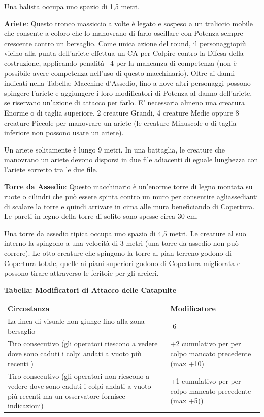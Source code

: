 \documentclass[a4paper,11pt,twoside,openany]{book}
\begin{document}
Una balista occupa uno spazio di 1,5 metri.

\textbf{Ariete}: Questo tronco massiccio a volte è legato e sospeso a un traliccio mobile che consente a coloro che lo manovrano di farlo oscillare con Potenza sempre crescente contro un bersaglio. Come unica azione del round, il personaggiopiù vicino alla punta dell'ariete effettua un CA per Colpire contro la Difesa della costruzione, applicando penalità --4 per la mancanza di competenza (non è possibile avere competenza nell'uso di questo macchinario). Oltre ai danni indicati nella Tabella: Macchine d'Assedio, fino a nove altri personaggi possono spingere l'ariete e aggiungere i loro modificatori di Potenza al danno dell'ariete, se riservano un'azione di attacco per farlo. E' necessaria almeno una creatura Enorme o di taglia superiore, 2 creature Grandi, 4 creature Medie oppure 8 creature Piccole per manovrare un ariete (le creature Minuscole o di taglia inferiore non possono usare un ariete).

Un ariete solitamente è lungo 9 metri. In una battaglia, le creature che manovrano un ariete devono disporsi in due file adiacenti di eguale lunghezza con l'ariete sorretto tra le due file.

\textbf{Torre da Assedio}: Questo macchinario è un'enorme torre di legno montata su ruote o cilindri che può essere spinta contro un muro per consentire agliassedianti di scalare la torre e quindi arrivare in cima alle mura beneficiando di Copertura. Le pareti in legno della torre di solito sono spesse circa 30 cm.

Una torre da assedio tipica occupa uno spazio di 4,5 metri. Le creature al suo interno la spingono a una velocità di 3 metri (una torre da assedio non può correre). Le otto creature che spingono la torre al pian terreno godono di Copertura totale, quelle ai piani superiori godono di Copertura migliorata e possono tirare attraverso le feritoie per gli arcieri.

\bigskip

\textbf{Tabella: Modificatori di Attacco delle Catapulte}

\begin{tabularx}{0.95\textwidth}{XX}
	\toprule
	\textbf{Circostanza}      & \textbf{Modificatore}\\
	La linea di visuale non giunge fino alla zona bersaglio & -6\\
	Tiro consecutivo (gli operatori riescono a vedere dove sono caduti i colpi andati a vuoto più recenti )   & +2 cumulativo per per colpo  mancato precedente (max +10)\\
	Tiro consecutivo (gli operatori non riescono a vedere dove sono caduti i colpi andati a vuoto più recenti ma un osservatore fornisce indicazioni) & +1 cumulativo per per colpo mancato precedente (max +5))\\
\end{tabularx}
\end{document}

